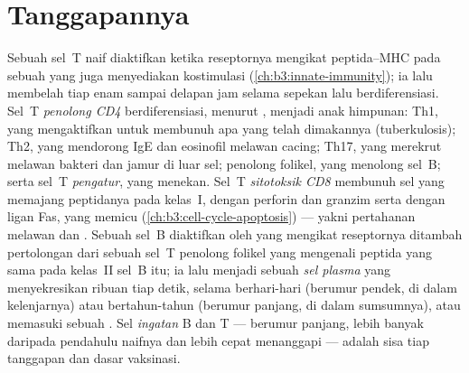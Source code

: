 \section{Tanggapannya}

\begin{definition}\label{def:b3:adaptive-immunity:response}
%
Sebuah sel~T naif diaktifkan ketika reseptornya mengikat peptida--MHC pada
sebuah  yang juga menyediakan kostimulasi (\cref{ch:b3:innate-immunity});
ia lalu membelah tiap enam sampai delapan jam selama sepekan lalu berdiferensiasi.
Sel~T \emph{penolong CD4} berdiferensiasi, menurut  , menjadi anak himpunan: Th1, yang mengaktifkan  untuk
membunuh apa yang telah dimakannya (tuberkulosis); Th2, yang mendorong IgE dan
eosinofil melawan cacing; Th17, yang merekrut  melawan
bakteri dan jamur di luar sel; penolong folikel, yang menolong
sel~B; serta sel~T \emph{pengatur}, yang menekan. Sel~T \emph{sitotoksik
CD8} membunuh sel yang memajang peptidanya pada kelas~I, dengan
perforin dan granzim serta dengan ligan Fas, yang memicu 
(\cref{ch:b3:cell-cycle-apoptosis}) --- yakni pertahanan melawan  dan
. Sebuah sel~B diaktifkan oleh  yang mengikat reseptornya ditambah
pertolongan dari sebuah sel~T penolong folikel yang mengenali peptida
 yang sama pada kelas~II sel~B itu; ia lalu menjadi sebuah \emph{sel
plasma} yang menyekresikan ribuan  tiap detik, selama berhari-hari
(berumur pendek, di dalam kelenjarnya) atau bertahun-tahun (berumur panjang, di
dalam sumsumnya), atau memasuki sebuah . Sel \emph{ingatan} B dan
T --- berumur panjang, lebih banyak daripada pendahulu naifnya dan lebih cepat
menanggapi --- adalah sisa tiap tanggapan dan dasar vaksinasi.
\end{definition}


